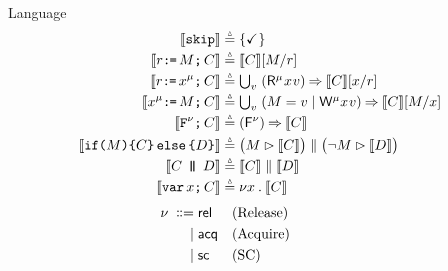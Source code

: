 Language
\begin{gather*}
  \begin{aligned}
    \sem[\aThrd]{\SKIP} & \eqdef
    \{ \DSTOP \}
    \\
    \sem[\aThrd]{\aReg\GETS\aExp\SEMI \aCmd} & \eqdef
    \sem[\aThrd]{\aCmd}[\aExp/\aReg]
    \\ 
    \sem{\aReg\GETS\aLoc^{\amode}\SEMI \aCmd} & \eqdef \textstyle\bigcup_\aVal\;
    (\DR[\amode]\aLoc\aVal)\prefix \sem{\aCmd} [\aLoc/\aReg]
    \\
    \sem{\aLoc^{\amode}\GETS\aExp\SEMI \aCmd} & \eqdef
    \textstyle\bigcup_\aVal\; (\aExp=\aVal \mid \DW[\amode]\aLoc\aVal)\prefix \sem{\aCmd}[\aExp/\aLoc]
    \\
    \sem{\FENCE^{\fmode}\SEMI \aCmd} & \eqdef
    (\DFS{\fmode}) \prefix \sem{\aCmd}
    \\
    \sem[\aThrd]{\IF{\aExp} \THEN \aCmd \ELSE \bCmd \FI} & \eqdef
    \bigl(\aExp \guard \sem[\aThrd]{\aCmd}\bigr) \parallel \bigl(\lnot\aExp \guard \sem[\aThrd]{\bCmd}\bigr) 
    \\
    \sem[\aThrd]{\aCmd \PAR[\bThrd][\bThrd'] \bCmd} & \eqdef
    \sem[\bThrd]{\aCmd} \parallel \sem[\bThrd']{\bCmd} 
    \\
    \sem[\aThrd]{\VAR\aLoc\SEMI \aCmd} & \eqdef
    \nu \aLoc \DOT \sem[\aThrd]{\aCmd}  
  \end{aligned}
\end{gather*}
\begin{align*}
  \nu \;\mathrel{\mathord{\vcentcolon}\mkern-1mu\mathord{\vcentcolon}\mathord{{=}}}\;&{\mathsf{rel}}  &&\text{(Release)} &\hbox{$\;\mkern60mu\;$}&
  \\ \;\mathrel{|}\;&{\mathsf{acq}}   &&\text{(Acquire)} 
  \\      \;\mathrel{|}\;&{\mathsf{sc}}  &&\text{(SC)} 
\end{align*}

